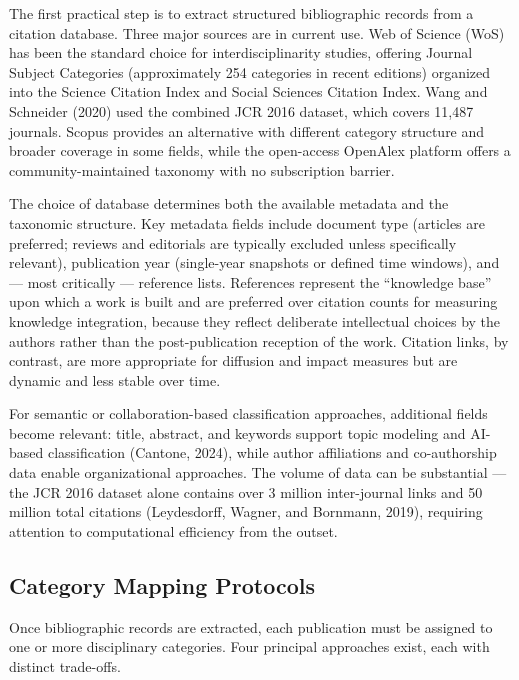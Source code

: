 \documentclass[
]{article}
\begin{document}
The first practical step is to extract structured bibliographic records
from a citation database. Three major sources are in current use. Web of
Science (WoS) has been the standard choice for interdisciplinarity
studies, offering Journal Subject Categories (approximately 254
categories in recent editions) organized into the Science Citation Index
and Social Sciences Citation Index. Wang and Schneider (2020) used the
combined JCR 2016 dataset, which covers 11,487 journals. Scopus provides
an alternative with different category structure and broader coverage in
some fields, while the open-access OpenAlex platform offers a
community-maintained taxonomy with no subscription barrier.

The choice of database determines both the available metadata and the
taxonomic structure. Key metadata fields include document type (articles
are preferred; reviews and editorials are typically excluded unless
specifically relevant), publication year (single-year snapshots or
defined time windows), and --- most critically --- reference lists.
References represent the ``knowledge base'' upon which a work is built
and are preferred over citation counts for measuring knowledge
integration, because they reflect deliberate intellectual choices by the
authors rather than the post-publication reception of the work. Citation
links, by contrast, are more appropriate for diffusion and impact
measures but are dynamic and less stable over time.

For semantic or collaboration-based classification approaches,
additional fields become relevant: title, abstract, and keywords support
topic modeling and AI-based classification (Cantone, 2024), while author
affiliations and co-authorship data enable organizational approaches.
The volume of data can be substantial --- the JCR 2016 dataset alone
contains over 3 million inter-journal links and 50 million total
citations (Leydesdorff, Wagner, and Bornmann, 2019), requiring attention
to computational efficiency from the outset.

\hypertarget{category-mapping-protocols}{%
\subsection{Category Mapping
Protocols}\label{category-mapping-protocols}}

Once bibliographic records are extracted, each publication must be
assigned to one or more disciplinary categories. Four principal
approaches exist, each with distinct trade-offs.
\end{document}
